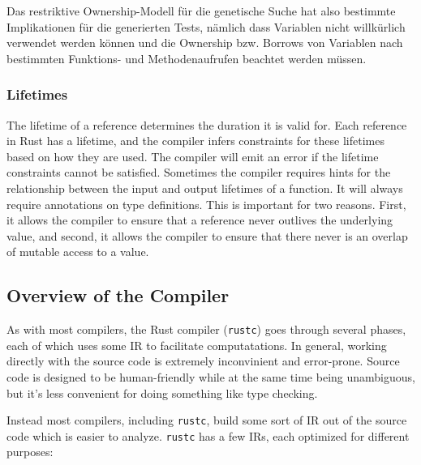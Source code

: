 \documentclass{article}
\begin{document}
Das restriktive Ownership-Modell für die genetische Suche hat also bestimmte Implikationen für die generierten Tests, nämlich dass Variablen nicht willkürlich verwendet werden können und die Ownership bzw. Borrows von Variablen nach bestimmten Funktions- und Methodenaufrufen beachtet werden müssen.

\subsubsection{Lifetimes}
The lifetime of a reference determines the duration it is valid for. Each reference in Rust has a lifetime, and the compiler infers constraints for these lifetimes based on how they are used. The compiler will emit an error if the lifetime constraints cannot be satisfied. Sometimes the compiler requires hints for the relationship between the input and output lifetimes of a function. It will always require annotations on type definitions. This is important for two reasons. First, it allows the compiler to ensure that a reference never outlives the underlying value, and second, it allows the compiler to ensure that there never is an overlap of mutable access to a value.

\newpage 
\subsection{Overview of the Compiler}
As with most compilers, the Rust compiler (\lstinline{rustc}) goes through several phases, each of which uses some \ac{IR} to facilitate computatations. In general, working directly with the source code is extremely inconvinient and error-prone. Source code is designed to be human-friendly while at the same time being unambiguous, but it's less convenient for doing something like type checking.

Instead most compilers, including \lstinline{rustc}, build some sort of \ac{IR} out of the source code which is easier to analyze. \lstinline{rustc} has a few \acp{IR}, each optimized for different purposes:
\end{document}
